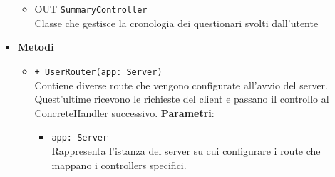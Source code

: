 \begin{itemize}
\begin{itemize}
		\item 
			OUT \texttt{SummaryController}\\
			Classe che gestisce la cronologia dei questionari svolti dall'utente
	\end{itemize}
		\item \textbf{Metodi} 
		\begin{itemize}
		\item 
		\texttt{+ UserRouter(app: Server)} \\
		Contiene diverse route che vengono configurate all’avvio del server. Quest’ultime ricevono le richieste del client e passano il controllo al ConcreteHandler successivo.
		\textbf{Parametri}:
			\begin{itemize}
				\item 
				\texttt{app: Server} \\
				Rappresenta l’istanza del server su cui configurare i route che mappano i controllers specifici.
			\end{itemize}
		\end{itemize}
\end{itemize}		
